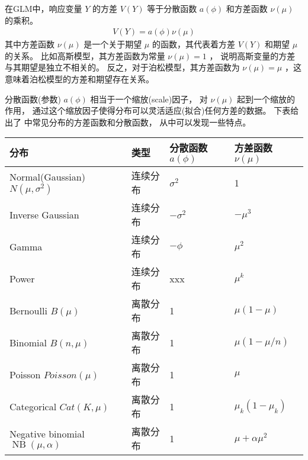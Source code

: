 \documentclass[letterpaper,10pt,english]{sphinxmanual}
\begin{document}
在GLM中，响应变量 \(Y\) 的方差 \(V(Y)\) 等于分散函数 \(a(\phi)\) 和方差函数 \(\nu(\mu)\)
的乘积。
\begin{equation}\label{equation:过度分散/content:过度分散/content:0}
\begin{split}V(Y) = a(\phi)\nu(\mu)\end{split}
\end{equation}
其中方差函数 \(\nu(\mu)\) 是一个关于期望 \(\mu\)
的函数，其代表着方差 \(V(Y)\) 和期望 \(\mu\) 的关系。
比如高斯模型，其方差函数为常量 \(\nu(\mu)=1\) ，
说明高斯变量的方差与其期望是独立不相关的。
反之，对于泊松模型，其方差函数为 \(\nu(\mu)=\mu\)
，这意味着泊松模型的方差和期望存在关系。

分散函数(参数) \(a(\phi)\) 相当于一个缩放(scale)因子，
对 \(\nu(\mu)\) 起到一个缩放的作用，
通过这个缩放因子使得分布可以灵活适应(拟合)任何方差的数据。
下表给出了  中常见分布的方差函数和分散函数，
从中可以发现一些特点。


\begin{savenotes}\sphinxattablestart
\centering
{}
\sphinxthecaptionisattop
{}\label{\detokenize{_u8fc7_u5ea6_u5206_u6563/content:id6}}
\sphinxaftertopcaption
\begin{tabulary}{\linewidth}[t]{|T|T|T|T|}
\hline
\sphinxstyletheadfamily 
分布
&\sphinxstyletheadfamily 
类型
&\sphinxstyletheadfamily 
分散函数 \(a(\phi)\)
&\sphinxstyletheadfamily 
方差函数 \(\nu(\mu)\)
\\
\hline
Normal(Gaussian) \(N(\mu,\sigma^2)\)
&
连续分布
&
\(\sigma^2\)
&
1
\\
\hline
Inverse Gaussian
&
连续分布
&
\(-\sigma^2\)
&
\(-\mu^3\)
\\
\hline
Gamma
&
连续分布
&
\(-\phi\)
&
\(\mu^2\)
\\
\hline
Power
&
连续分布
&
xxx
&
\(\mu^k\)
\\
\hline
Bernoulli \(B(\mu)\)
&
离散分布
&
1
&
\(\mu(1-\mu)\)
\\
\hline
Binomial \(B(n,\mu)\)
&
离散分布
&
1
&
\(\mu(1-\mu/n)\)
\\
\hline
Poisson \(Poisson(\mu)\)
&
离散分布
&
1
&
\(\mu\)
\\
\hline
Categorical \(Cat(K,\mu)\)
&
离散分布
&
1
&
\(\mu_k(1-\mu_k)\)
\\
\hline
Negative binomial \(\mathop{NB}(\mu,\alpha)\)
&
离散分布
&
1
&
\(\mu+\alpha\mu^2\)
\\
\hline
\end{tabulary}
\par
\sphinxattableend\end{savenotes}
\end{document}

